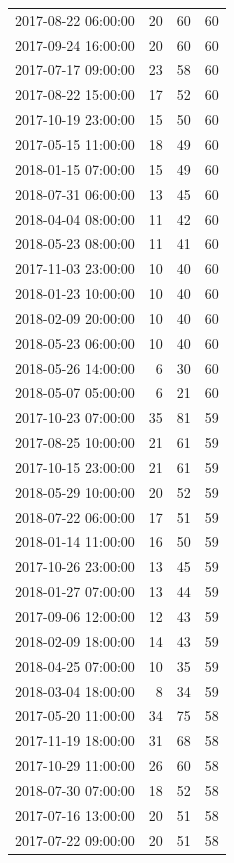 \begin{tabular}{lrrr}
2017-08-22 06:00:00 & 20 & 60 & 60 \\
2017-09-24 16:00:00 & 20 & 60 & 60 \\
2017-07-17 09:00:00 & 23 & 58 & 60 \\
2017-08-22 15:00:00 & 17 & 52 & 60 \\
2017-10-19 23:00:00 & 15 & 50 & 60 \\
2017-05-15 11:00:00 & 18 & 49 & 60 \\
2018-01-15 07:00:00 & 15 & 49 & 60 \\
2018-07-31 06:00:00 & 13 & 45 & 60 \\
2018-04-04 08:00:00 & 11 & 42 & 60 \\
2018-05-23 08:00:00 & 11 & 41 & 60 \\
2017-11-03 23:00:00 & 10 & 40 & 60 \\
2018-01-23 10:00:00 & 10 & 40 & 60 \\
2018-02-09 20:00:00 & 10 & 40 & 60 \\
2018-05-23 06:00:00 & 10 & 40 & 60 \\
2018-05-26 14:00:00 & 6 & 30 & 60 \\
2018-05-07 05:00:00 & 6 & 21 & 60 \\
2017-10-23 07:00:00 & 35 & 81 & 59 \\
2017-08-25 10:00:00 & 21 & 61 & 59 \\
2017-10-15 23:00:00 & 21 & 61 & 59 \\
2018-05-29 10:00:00 & 20 & 52 & 59 \\
2018-07-22 06:00:00 & 17 & 51 & 59 \\
2018-01-14 11:00:00 & 16 & 50 & 59 \\
2017-10-26 23:00:00 & 13 & 45 & 59 \\
2018-01-27 07:00:00 & 13 & 44 & 59 \\
2017-09-06 12:00:00 & 12 & 43 & 59 \\
2018-02-09 18:00:00 & 14 & 43 & 59 \\
2018-04-25 07:00:00 & 10 & 35 & 59 \\
2018-03-04 18:00:00 & 8 & 34 & 59 \\
2017-05-20 11:00:00 & 34 & 75 & 58 \\
2017-11-19 18:00:00 & 31 & 68 & 58 \\
2017-10-29 11:00:00 & 26 & 60 & 58 \\
2018-07-30 07:00:00 & 18 & 52 & 58 \\
2017-07-16 13:00:00 & 20 & 51 & 58 \\
2017-07-22 09:00:00 & 20 & 51 & 58 \\

\end{tabular}
